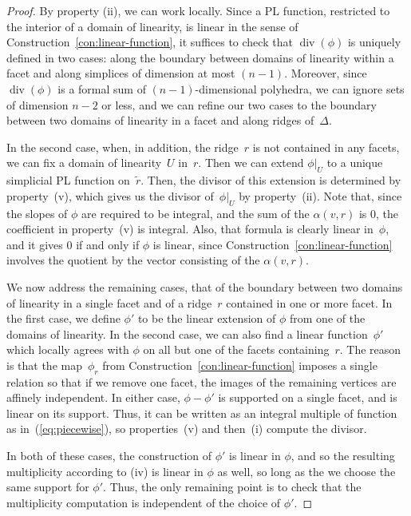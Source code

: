 \documentclass[11pt,reqno]{amsart}
\theoremstyle{definition}
\renewcommand{\div}{\operatorname{div}}
\begin{document}
\begin{proof}
By property (ii), we can work locally. Since a PL function, restricted to the
interior of a domain of linearity, is linear in the sense of
Construction~\ref{con:linear-function}, it suffices to check that $\div(\phi)$ is
uniquely defined in two cases: along the boundary between domains of linearity
within a facet and along simplices of dimension at most $(n-1)$. Moreover, since
$\div(\phi)$ is a formal sum of $(n-1)$-dimensional polyhedra, we can ignore
sets of dimension $n-2$ or less, and we can refine our two cases to the boundary
between two domains of linearity in a facet and along ridges of~$\Delta$.

In the second case, when, in addition, the ridge~$r$ is not contained in any
facets, we can fix a domain of linearity~$U$ in~$r$. Then we can extend
$\phi\vert_U$ to a unique simplicial PL function on~$\tilde r$.
Then, the divisor of this extension is determined by property~(v), which gives
us the divisor of~$\phi\vert_U$ by property~(ii). Note that, since the slopes of
$\phi$ are required to be integral, and the sum of the $\alpha(v,r)$ is $0$, the
coefficient in property~(v) is integral. Also, that formula is clearly linear
in~$\phi$, and it gives $0$ if and only if $\phi$ is linear, since
Construction~\ref{con:linear-function} involves the quotient by the vector
consisting of the $\alpha(v,r)$.

We now address the remaining cases, that of the boundary between two domains of
linearity in a single facet and of a ridge~$r$ contained in one or more facet.
In the first case, we define $\phi'$ to be the linear extension of $\phi$ from
one of the domains of linearity. In the second case, we can also find a linear
function~$\phi'$ which locally agrees with $\phi$ on all but one of the facets
containing~$r$. The reason is that the map~$\phi_r$ from
Construction~\ref{con:linear-function} imposes a single relation so that if we
remove one facet, the images of the remaining vertices are affinely independent.
In either case, $\phi - \phi'$ is supported on a single facet, and is linear on
its support. Thus, it can be written as an integral multiple of function as
in~(\ref{eq:piecewise}), so properties~(v) and then~(i) compute the divisor.

In both of these cases, the construction of $\phi'$ is linear in $\phi$, and so
the resulting multiplicity according to (iv) is linear in $\phi$ as well, so
long as the we choose the same support for $\phi'$. Thus, the only remaining
point is to check that the multiplicity computation is independent of the choice
of $\phi'$.


\end{proof}
\end{document}
